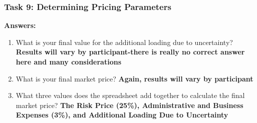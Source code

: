 \documentclass[letterpaper,10pt,english]{sphinxmanual}
\begin{document}
\subsubsection{Task 9: Determining Pricing Parameters}
\label{wiiet/wiiet_initialtomarketpricinganskey:task-9-determining-pricing-parameters}
\textbf{Answers:}
\begin{enumerate}
\item {} 
What is your final value for the additional loading due to uncertainty? \textbf{Results will vary by participant-there is really no correct answer here and many considerations}

\item {} 
What is your final market price? \textbf{Again, results will vary by participant}

\item {} 
What three values does the spreadsheet add together to calculate the final market price? \textbf{The Risk Price (25\%), Administrative and Business Expenses (3\%), and Additional Loading Due to Uncertainty}

\end{enumerate}



\renewcommand{\indexname}{Index}
\printindex
\end{document}
